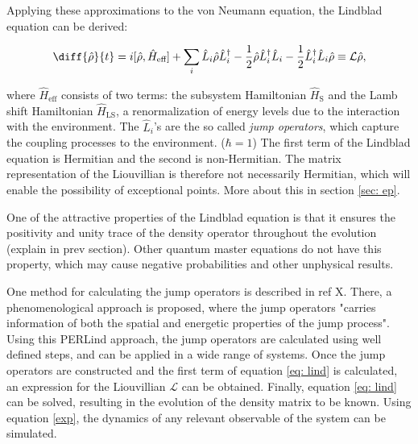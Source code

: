 \documentclass[../main.tex]{subfiles}
\begin{document}
Applying these approximations to the von Neumann equation, the Lindblad equation can be derived:

\begin{equation}\label{eq: lind}
    \diff{\hat\rho}{t} = i[\hat\rho, \hat H_\text{eff}] + \sum_i \hat L_i\hat\rho\hat L_i^\dag - \frac{1}{2}\hat\rho\hat L_i^\dag\hat L_i - \frac{1}{2}\hat L_i^\dag\hat L_i \hat\rho \equiv \mathcal{L}\hat\rho,
\end{equation}

where $\hat H_\text{eff}$ consists of two terms: the subsystem Hamiltonian $\hat H_\text{S}$ and the Lamb shift Hamiltonian $\hat H_\text{LS}$, a renormalization of energy levels due to the interaction with the environment. The $\hat L_i$'s are the so called \textit{jump operators}, which capture the coupling processes to the environment. ($\hbar=1$) The first term of the Lindblad equation is Hermitian and the second is non-Hermitian. The matrix representation of the Liouvillian is therefore not necessarily Hermitian, which will enable the possibility of exceptional points. More about this in section \ref{sec: ep}.

One of the attractive properties of the Lindblad equation is that it ensures the positivity and unity trace of the density operator throughout the evolution (explain in prev section). Other quantum master equations do not have this property, which may cause negative probabilities and other unphysical results.

One method for calculating the jump operators is described in ref X. There, a phenomenological approach is proposed, where the jump operators "carries information of both the spatial and energetic properties of the jump process". Using this PERLind approach, the jump operators are calculated using well defined steps, and can be applied in a wide range of systems. Once the jump operators are constructed and the first term of equation \ref{eq: lind} is calculated, an expression for the Liouvillian $\mathcal{L}$ can be obtained. Finally, equation \ref{eq: lind} can be solved, resulting in the evolution of the density matrix to be known. Using equation \ref{exp}, the dynamics of any relevant observable of the system can be simulated.
\end{document}
